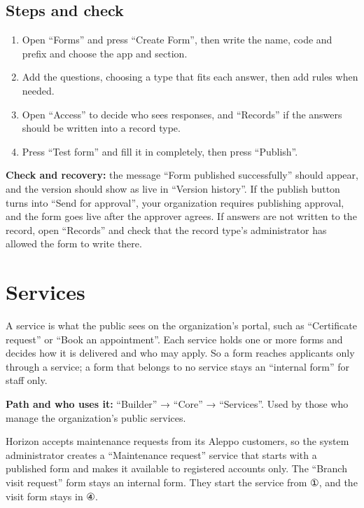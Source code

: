 \subsection{Steps and check}
\begin{enumerate}
\item Open “Forms” and press “Create Form”, then write the name, code and prefix and choose the app and section.
\item Add the questions, choosing a type that fits each answer, then add rules when needed.
\item Open “Access” to decide who sees responses, and “Records” if the answers should be written into a record type.
\item Press “Test form” and fill it in completely, then press “Publish”.
\end{enumerate}

\textbf{Check and recovery:} the message “Form published successfully” should appear, and the version should show as live in “Version history”. If the publish button turns into “Send for approval”, your organization requires publishing approval, and the form goes live after the approver agrees. If answers are not written to the record, open “Records” and check that the record type's administrator has allowed the form to write there.

\clearpage
\section{Services}
\label{sec:builder-feature-services}

A service is what the public sees on the organization's portal, such as “Certificate request” or “Book an appointment”. Each service holds one or more forms and decides how it is delivered and who may apply. So a form reaches applicants only through a service; a form that belongs to no service stays an “internal form” for staff only.

\textbf{Path and who uses it:} “Builder” → “Core” → “Services”. Used by those who manage the organization's public services.

\begin{rcnote}
Horizon accepts maintenance requests from its Aleppo customers, so the system administrator creates a “Maintenance request” service that starts with a published form and makes it available to registered accounts only. The “Branch visit request” form stays an internal form. They start the service from ①, and the visit form stays in ④.
\end{rcnote}

